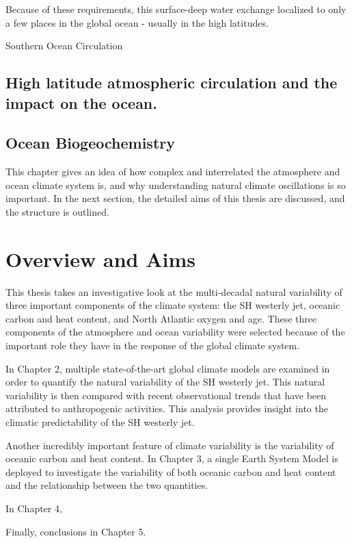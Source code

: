 Because of these requirements, this surface-deep water exchange localized to only a few places in the global ocean - usually in the high latitudes.

Southern Ocean Circulation

\subsection{High latitude atmospheric circulation and the impact on the ocean. }
\subsection{Ocean Biogeochemistry}

This chapter gives an idea of how complex and interrelated the atmosphere and ocean climate system is, and why understanding natural climate oscillations is so important. In the next section, the detailed aims of this thesis are discussed, and the structure is outlined.



\section{Overview and Aims}
This thesis takes an investigative look at the multi-decadal natural variability of three important components of the climate system: the SH westerly jet, oceanic carbon and heat content, and North Atlantic oxygen and age. These three components of the atmosphere and ocean variability were selected because of the important role they have in the response of the global climate system.

In Chapter 2, multiple state-of-the-art global climate models are examined in order to quantify the natural variability of the SH westerly jet. This natural variability is then compared with recent observational trends that have been attributed to anthropogenic activities. This analysis provides insight into the climatic predictability of the SH westerly jet.

Another incredibly important feature of climate variability is the variability of oceanic carbon and heat content. In Chapter 3, a single Earth System Model is deployed to investigate the variability of both oceanic carbon and heat content and the relationship between the two quantities.

In Chapter 4,

Finally, conclusions in Chapter 5.


